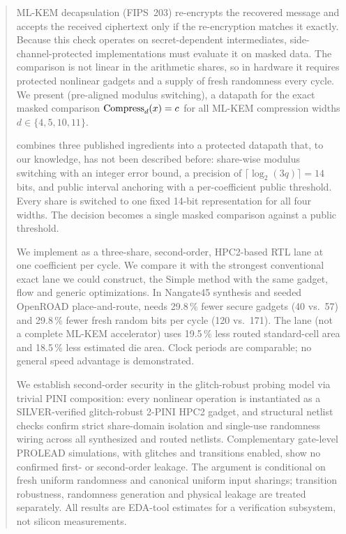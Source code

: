 \begin{abstract}
\noindent
ML-KEM decapsulation (FIPS~203) re-encrypts the recovered message and accepts the received ciphertext only if the re-encryption matches it exactly. Because this check operates on secret-dependent intermediates, side-channel-protected implementations must evaluate it on masked data. The comparison is not linear in the arithmetic shares, so in hardware it requires protected nonlinear gadgets and a supply of fresh randomness every cycle. We present \PAMS{} (pre-aligned modulus switching), a datapath for the exact masked comparison $\Comp(x) = c$ for all ML-KEM compression widths $d \in \{4,5,10,11\}$.

\PAMS{} combines three published ingredients into a protected datapath that, to our knowledge, has not been described before: share-wise modulus switching with an integer error bound, a precision of $\lceil \log_2(3q) \rceil = 14$ bits, and public interval anchoring with a per-coefficient public threshold. Every share is switched to one fixed 14-bit representation for all four widths. The decision becomes a single masked comparison against a public threshold.

We implement \PAMS{} as a three-share, second-order, HPC2-based RTL lane at one coefficient per cycle. We compare it with the strongest conventional exact lane we could construct, the Simple method with the same gadget, flow and generic optimizations. In Nangate45 synthesis and seeded OpenROAD place-and-route, \PAMS{} needs \num{29.8}\,\% fewer secure gadgets (40 vs.\ 57) and \num{29.8}\,\% fewer fresh random bits per cycle (120 vs.\ 171). The lane (not a complete ML-KEM accelerator) uses \num{19.5}\,\% less routed standard-cell area and \num{18.5}\,\% less estimated die area. Clock periods are comparable; no general speed advantage is demonstrated.

We establish second-order security in the glitch-robust probing model via trivial PINI composition: every nonlinear operation is instantiated as a SILVER-verified glitch-robust 2-PINI HPC2 gadget, and structural netlist checks confirm strict share-domain isolation and single-use randomness wiring across all synthesized and routed netlists. Complementary gate-level PROLEAD simulations, with glitches and transitions enabled, show no confirmed first- or second-order leakage. The argument is conditional on fresh uniform randomness and canonical uniform input sharings; transition robustness, randomness generation and physical leakage are treated separately. All results are EDA-tool estimates for a verification subsystem, not silicon measurements.
\end{abstract}
